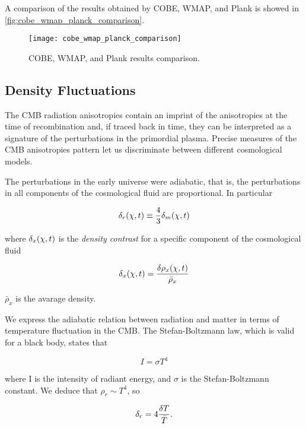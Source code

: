 A comparison of the results obtained by COBE, WMAP, and Plank is showed in
\autoref{fig:cobe_wmap_planck_comparison}.

\begin{figure}
        \centering
        \texttt{[image: cobe\_wmap\_planck\_comparison]}
        \caption{COBE, WMAP, and Plank results comparison.}
        \label{fig:cobe_wmap_planck_comparison}
\end{figure}

\subsection{Density Fluctuations}

The CMB radiation anisotropies contain an imprint of the anisotropies at
the time of recombination and, if traced back in time, they can be
interpreted as a signature of the perturbations in the primordial plasma.
Precise measures of the CMB anisotropies pattern let us discriminate
between different cosmological models.

The perturbations in the early universe were adiabatic, that is, the
perturbations in all components of the cosmological fluid are proportional.
In particular

\begin{equation}
        \delta_r\qty(\vb{\chi},t) \equiv \frac{4}{3} \delta_m\qty(\vb{\chi},t)
\end{equation}

where $\delta_x\qty(\vb{\chi},t)$ is the \emph{density contrast} for a
specific component of the cosmological fluid

\begin{equation}
        \delta_x\qty(\vb{\chi},t) = \frac{\var{\rho_x\qty(\vb{\chi},t)}}{\bar \rho_x}
\end{equation}

$\bar \rho_x$ is the avarage density.

We express the adiabatic relation between radiation and matter in terms of
temperature fluctuation in the CMB. The Stefan-Boltzmann law, which is
valid for a black body, states that

\begin{equation}
        I = \sigma T^4
\end{equation}

where I is the intensity of radiant energy, and $\sigma$ is the
Stefan-Boltzmann constant. We deduce that $\rho_r \sim T^4$, so

\begin{equation}
        \delta_r = 4 \frac{\var{T}}{\bar T}.
\end{equation}

